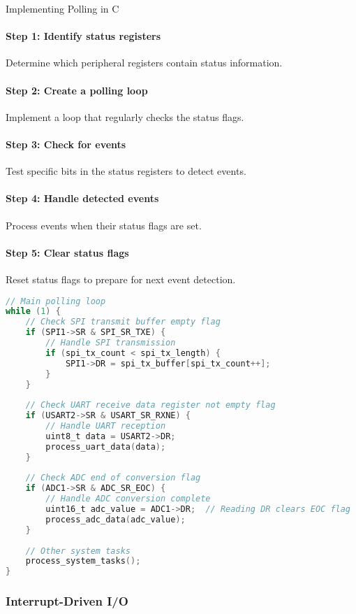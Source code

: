 \begin{KR}{Implementing Polling in C}
\paragraph{Step 1: Identify status registers}
Determine which peripheral registers contain status information.
\paragraph{Step 2: Create a polling loop}
Implement a loop that regularly checks the status flags.
\paragraph{Step 3: Check for events}
Test specific bits in the status registers to detect events.
\paragraph{Step 4: Handle detected events}
Process events when their status flags are set.
\paragraph{Step 5: Clear status flags}
Reset status flags to prepare for next event detection.

\begin{lstlisting}[language=C, style=basesmol]
// Main polling loop
while (1) {
    // Check SPI transmit buffer empty flag
    if (SPI1->SR & SPI_SR_TXE) {
        // Handle SPI transmission
        if (spi_tx_count < spi_tx_length) {
            SPI1->DR = spi_tx_buffer[spi_tx_count++];
        }
    }
    
    // Check UART receive data register not empty flag
    if (USART2->SR & USART_SR_RXNE) {
        // Handle UART reception
        uint8_t data = USART2->DR;
        process_uart_data(data);
    }
    
    // Check ADC end of conversion flag
    if (ADC1->SR & ADC_SR_EOC) {
        // Handle ADC conversion complete
        uint16_t adc_value = ADC1->DR;  // Reading DR clears EOC flag
        process_adc_data(adc_value);
    }
    
    // Other system tasks
    process_system_tasks();
}
\end{lstlisting}
\end{KR}

\raggedcolumns
\columnbreak

\subsubsection{Interrupt-Driven I/O}

